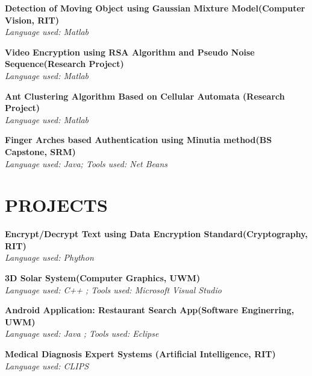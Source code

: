 \documentclass{res}
\begin{document}
\begin{resume}
\vspace{-0.1in} 
    {\bf Detection of Moving Object using Gaussian Mixture Model(Computer Vision, RIT)  }
\\ \emph{ Language used: Matlab }

\vspace{-0.1in} 
   {\bf Video Encryption using RSA Algorithm and Pseudo Noise Sequence(Research Project) }
\\ \emph{ Language used: Matlab  }

\vspace{-0.1in} 
   {\bf Ant Clustering Algorithm Based on Cellular Automata (Research Project) }
\\ \emph{ Language used: Matlab  }

\vspace{-0.1in} 

 {\bf Finger Arches based Authentication using Minutia method(BS Capstone, SRM)  }
\\ \emph{ Language used: Java; Tools used: Net Beans   }



\section{PROJECTS}
\vspace{0.1in} 

 {\bf Encrypt/Decrypt Text using Data Encryption Standard(Cryptography, RIT)  }
\\ \emph{ Language used: Phython  }

\vspace{-0.1in} 

 {\bf 3D Solar System(Computer Graphics, UWM) }
\\ \emph{ Language used: C++ ; Tools used: Microsoft Visual Studio  }

\vspace{-0.1in} 

 {\bf Android Application: Restaurant Search App(Software Enginerring, UWM) }
\\ \emph{ Language used: Java ; Tools used: Eclipse }

\vspace{-0.1in} 

 {\bf Medical Diagnosis Expert Systems (Artificial Intelligence, RIT) }
\\ \emph{ Language used: CLIPS }


\vspace{-0.1in} 


\end{resume}
\end{document}

